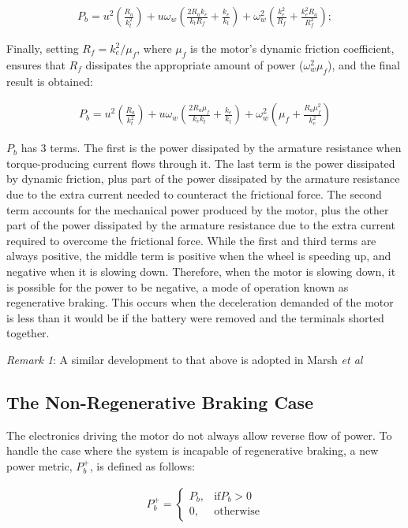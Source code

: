 \documentclass[letterpaper, paper,11pt]{AAS}
\begin{document}
\begin{align}
P_b = u^{2}\left(\frac{R_a}{k_t^2}\right) + u\omega_w\left(\frac{2R_ak_e}{k_tR_f}+\frac{k_e}{k_t}\right) + \omega_w^{2}\left(\frac{k_e^2}{R_f}+\frac{k_e^2R_a}{R_f^2}\right)
;
\end{align}

\noindent Finally, setting $R_f = k_e^2/\mu_f$, where $\mu_f$ is the motor's dynamic friction coefficient, ensures that $R_f$ dissipates the appropriate amount of power ($\omega_w^2\mu_f$), and the final result is obtained:

\begin{align}
\label{eqn7}
P_b = u^{2}\left(\frac{R_a}{k_t^2}\right) + u\omega_w\left(\frac{2R_a\mu_f}{k_ek_t}+\frac{k_e}{k_t}\right) + \omega_w^{2}\left(\mu_f+\frac{R_a\mu_f^2}{k_e^2}\right)
\end{align}

$P_b$ has 3 terms. The first is the power dissipated by the armature resistance when torque-producing current flows through it. The last term is the power dissipated by dynamic friction, plus part of the power dissipated by the armature resistance due to the extra current needed to counteract the frictional force. The second term accounts for the mechanical power produced by the motor, plus the other part of the power dissipated by the armature resistance due to the extra current required to overcome the frictional force. While the first and third terms are always positive, the middle term is positive when the wheel is speeding up, and negative when it is slowing down. Therefore, when the motor is slowing down, it is possible for the power to be negative, a mode of operation known as regenerative braking. This occurs when the deceleration demanded of the motor is less than it would be if the battery were removed and the terminals shorted together. 

\noindent \textit{Remark 1}: A similar development to that above is adopted in Marsh \textit{et al} \cite{Marsh2015}

\subsection{The Non-Regenerative Braking Case}
The electronics driving the motor do not always allow reverse flow of power. To handle the case where the system is incapable of regenerative braking, a new power metric, $P_b^+$, is defined as follows:

\begin{align}
P_b^+ = \begin{cases}
P_b, & \text{if} P_b > 0 \\
0, & \text{otherwise}
\end{cases}
\end{align}
\end{document}
